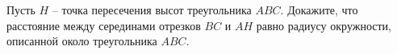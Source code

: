 \begin{ex}
	\begin{condition}
		Пусть \( H \) – точка пересечения высот треугольника \( ABC \). Докажите, что расстояние между серединами отрезков \( BC  \) и \( AH \) равно радиусу окружности, описанной около	треугольника \( ABC \).
	\end{condition}
\end{ex}